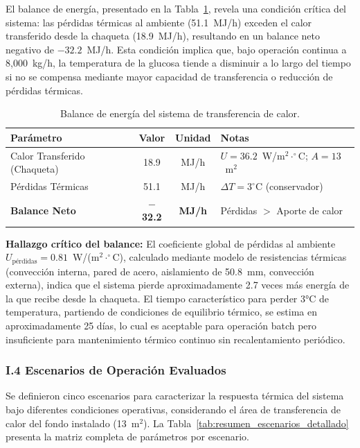 El balance de energía, presentado en la Tabla~\ref{tab:resumen_balance_energia}, revela una condición crítica del sistema: las pérdidas térmicas al ambiente (51.1~MJ/h) exceden el calor transferido desde la chaqueta (18.9~MJ/h), resultando en un balance neto negativo de $-32.2$~MJ/h. Esta condición implica que, bajo operación continua a 8,000~kg/h, la temperatura de la glucosa tiende a disminuir a lo largo del tiempo si no se compensa mediante mayor capacidad de transferencia o reducción de pérdidas térmicas.

\begin{table}[H]
\centering
\caption{Balance de energía del sistema de transferencia de calor.}
\label{tab:resumen_balance_energia}
\footnotesize
\begin{tabular}{@{}lccl@{}}
\toprule
\textbf{Parámetro} & \textbf{Valor} & \textbf{Unidad} & \textbf{Notas} \\
\midrule
Calor Transferido (Chaqueta) & 18.9 & MJ/h & $U = 36.2$~W/m$^2\cdot^\circ$C; $A = 13$~m$^2$ \\
Pérdidas Térmicas & 51.1 & MJ/h & $\Delta T = 3^\circ$C (conservador) \\
\midrule
\textbf{Balance Neto} & \textbf{$-$32.2} & \textbf{MJ/h} & Pérdidas $>$ Aporte de calor \\
\bottomrule
\end{tabular}
\end{table}

\textbf{Hallazgo crítico del balance:} El coeficiente global de pérdidas al ambiente $U_{\text{pérdidas}} = 0.81$~W/(m$^2\cdot^\circ$C), calculado mediante modelo de resistencias térmicas (convección interna, pared de acero, aislamiento de 50.8~mm, convección externa), indica que el sistema pierde aproximadamente 2.7 veces más energía de la que recibe desde la chaqueta. El tiempo característico para perder 3°C de temperatura, partiendo de condiciones de equilibrio térmico, se estima en aproximadamente 25 días, lo cual es aceptable para operación batch pero insuficiente para mantenimiento térmico continuo sin recalentamiento periódico.

\subsubsection*{I.4 Escenarios de Operación Evaluados}

Se definieron cinco escenarios para caracterizar la respuesta térmica del sistema bajo diferentes condiciones operativas, considerando el área de transferencia de calor del fondo instalado (13~m$^2$). La Tabla~\ref{tab:resumen_escenarios_detallado} presenta la matriz completa de parámetros por escenario.

